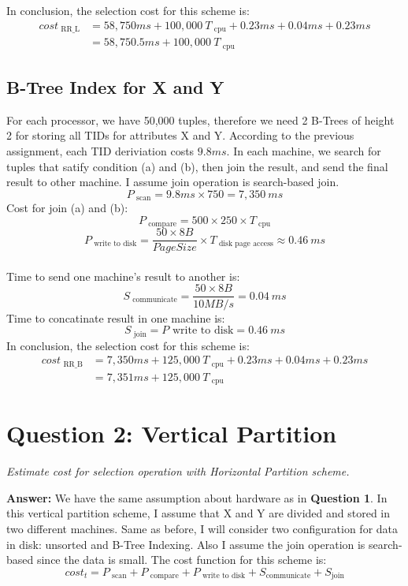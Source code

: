 \documentclass[a4paper,12pt]{article}
\begin{document}
In conclusion, the selection cost for this scheme is:
\begin{equation*}
\begin{aligned}
cost_{\mbox{ RR\_L}} &= 58,750ms + 100,000\ T_{\mbox{ cpu}} + 0.23ms + 0.04ms + 0.23ms\\ &= 58,750.5ms + 100,000\ T_{\mbox{ cpu}}
\end{aligned}
\end{equation*}

\subsection{B-Tree Index for X and Y}
For each processor, we have 50,000 tuples, therefore we need 2 B-Trees of height 2 for storing all TIDs for attributes X and Y. According to the previous assignment, each TID deriviation costs $9.8ms$. In each machine, we search for tuples that satify condition (a) and (b), then join the result, and send the final result to other machine. I assume join operation is search-based join.
$$ P_{\mbox{ scan}} = 9.8ms \times 750 = 7,350\ ms $$ 
Cost for join (a) and (b):
$$ P_{\mbox{ compare}} = 500 \times 250 \times T_{\mbox{ cpu}}$$
$$ P_{\mbox{ write to disk}} = \frac{50 \times 8B}{Page Size} \times T_{\mbox{ disk page access}} \approx 0.46\ ms $$ \\[0.3em]
Time to send one machine's result to another is:
$$ S_{\mbox{ communicate}} = \frac{50 \times 8B}{10MB/s} = 0.04\ ms $$ 
Time to concatinate result in one machine is:
$$ S_{\mbox{ join}} = P{\mbox{ write to disk}} = 0.46\ ms $$
In conclusion, the selection cost for this scheme is:
\begin{equation*}
\begin{aligned}
cost_{\mbox{ RR\_B}} &= 7,350ms + 125,000\ T_{\mbox{ cpu}} + 0.23ms + 0.04ms + 0.23ms\\ &= 7,351ms + 125,000\ T_{\mbox{ cpu}}
\end{aligned}
\end{equation*}

\section*{Question 2: Vertical Partition}
\setcounter{section}{2}
\setcounter{subsection}{0}
\textit{Estimate cost for selection operation with Horizontal Partition scheme.} 

\vspace{1.5em}
\noindent
\textbf{Answer:} 
\noindent
We have the same assumption about hardware as in \textbf{Question 1}. In this vertical partition scheme, I assume that X and Y are divided and stored in two different machines. Same as before, I will consider two configuration for data in disk: unsorted and B-Tree Indexing. Also I assume the join operation is search-based since the data is small. The cost function for this scheme is:
$$ cost_{ t} = P_{\mbox{ scan}} + P_{\mbox{ compare}} + P_{\mbox{ write to disk}} + S_{\mbox{communicate}} + S_{\mbox{join}} $$
\end{document}
